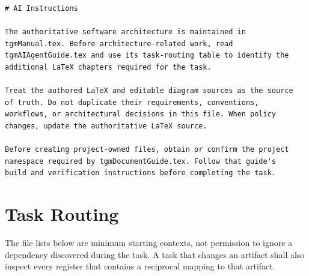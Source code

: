 \begin{verbatim}
# AI Instructions

The authoritative software architecture is maintained in
tgmManual.tex. Before architecture-related work, read
tgmAIAgentGuide.tex and use its task-routing table to identify the
additional LaTeX chapters required for the task.

Treat the authored LaTeX and editable diagram sources as the source
of truth. Do not duplicate their requirements, conventions,
workflows, or architectural decisions in this file. When policy
changes, update the authoritative LaTeX source.

Before creating project-owned files, obtain or confirm the project
namespace required by tgmDocumentGuide.tex. Follow that guide's
build and verification instructions before completing the task.
\end{verbatim}

\section{Task Routing}
The file lists below are minimum starting contexts, not permission to ignore a
dependency discovered during the task. A task that changes an artifact shall
also inspect every register that contains a reciprocal mapping to that
artifact.

